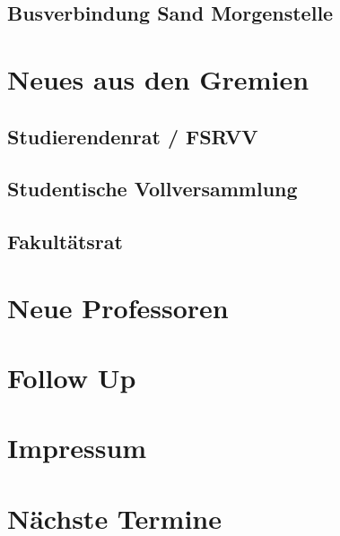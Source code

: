 \documentclass{fsinewsletter}
\begin{document}
\subsection{Busverbindung Sand Morgenstelle}

\newpage
\section{Neues aus den Gremien}


\subsection{Studierendenrat / FSRVV}


\subsection{Studentische Vollversammlung}


\subsection{Fakultätsrat}

\newpage
\section{Neue Professoren}


\newpage
\section{Follow Up}


\newpage
\section{Impressum}


%
\newpage
\section{Nächste Termine}

\end{document}
